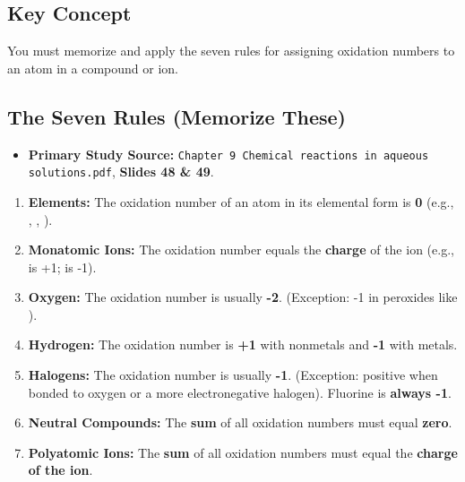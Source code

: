 \documentclass{article}
\begin{document}
\subsection*{Key Concept}
You must memorize and apply the seven rules for assigning oxidation numbers to an atom in a compound or ion.

\subsection*{The Seven Rules (Memorize These)}
\begin{itemize}[itemsep=5pt]
    \item \textbf{Primary Study Source:} \texttt{Chapter 9 Chemical reactions in aqueous solutions.pdf}, \textbf{Slides 48 \& 49}.
\end{itemize}
\begin{enumerate}[label=\textbf{Rule \arabic*:}, itemsep=5pt]
    \item \textbf{Elements:} The oxidation number of an atom in its elemental form is \textbf{0} (e.g., , , ).
    \item \textbf{Monatomic Ions:} The oxidation number equals the \textbf{charge} of the ion (e.g.,  is +1;  is -1).
    \item \textbf{Oxygen:} The oxidation number is usually \textbf{-2}. (Exception: -1 in peroxides like ).
    \item \textbf{Hydrogen:} The oxidation number is \textbf{+1} with nonmetals and \textbf{-1} with metals.
    \item \textbf{Halogens:} The oxidation number is usually \textbf{-1}. (Exception: positive when bonded to oxygen or a more electronegative halogen). Fluorine is \textbf{always -1}.
    \item \textbf{Neutral Compounds:} The \textbf{sum} of all oxidation numbers must equal \textbf{zero}.
    \item \textbf{Polyatomic Ions:} The \textbf{sum} of all oxidation numbers must equal the \textbf{charge of the ion}.
\end{enumerate}
\end{document}
